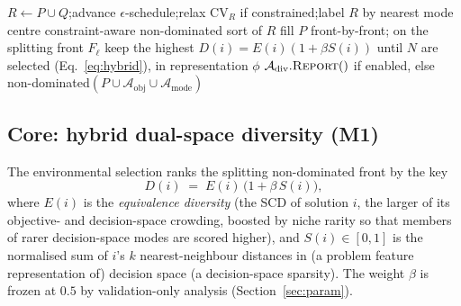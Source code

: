 \begin{algorithm}[t]
\begin{algorithmic}[1]
  \State $R \gets P \cup Q$;\quad advance $\epsilon$-schedule;\quad relax $\mathrm{CV}_R$ if constrained;\quad label $R$ by nearest mode centre
  \State constraint-aware non-dominated sort of $R$
  \State fill $P$ front-by-front; on the splitting front $F_\ell$ keep the highest
  $D(i){=}E(i)(1{+}\beta S(i))$ until $N$ are selected (Eq.~\eqref{eq:hybrid}), in representation $\phi$
\EndWhile
\State \Return $\mathcal{A}_{\mathrm{div}}.\textsc{Report}()$ if enabled, else
  non-dominated$(P\cup\mathcal{A}_{\mathrm{obj}}\cup\mathcal{A}_{\mathrm{mode}})$
\end{algorithmic}
\end{algorithm}

\subsection{Core: hybrid dual-space diversity (M1)}
\label{sec:hybrid}
The environmental selection ranks the splitting non-dominated front by the key
\begin{equation}
  D(i) \;=\; E(i)\,\bigl(1 + \beta\, S(i)\bigr),
  \label{eq:hybrid}
\end{equation}
where $E(i)$ is the \emph{equivalence diversity} (the SCD of solution $i$, the larger of
its objective- and decision-space crowding, boosted by niche rarity so that members of rarer
decision-space modes are scored higher), and $S(i)\in[0,1]$ is the normalised sum of
$i$'s $k$ nearest-neighbour distances in (a problem feature representation of) decision
space (a decision-space sparsity). The weight $\beta$ is frozen at $0.5$ by
validation-only analysis (Section~\ref{sec:param}).

